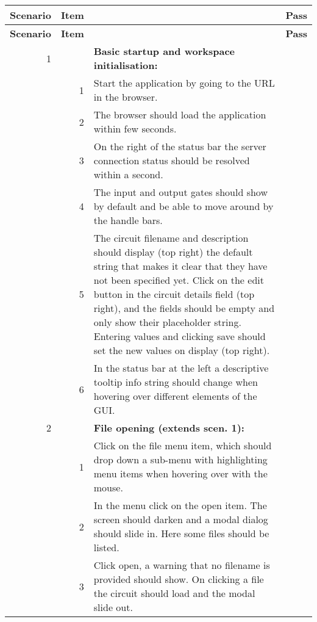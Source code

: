 \documentclass{article}
\begin{document}
\begin{center}
\begin{longtable}{r r  p{} l } \toprule
\textbf{Scenario} & \textbf{Item} & & \textbf{Pass} \\\midrule
\endfirsthead
\toprule
\textbf{Scenario} & \textbf{Item} & & \textbf{Pass} \\\midrule
\endhead
1 && \textbf{Basic startup and workspace initialisation:}\\
&1& Start the application by going to the URL in the browser.\\
&2& The browser should load the application within few seconds.\\
&3& On the right of the status bar the server connection status should be resolved within a second. \\
&4& The input and output gates should show by default and be able to move around by the handle bars. \\
&5& The circuit filename and description should display (top right) the default string that makes it clear that they have not been specified yet. Click on the edit button in the circuit details field (top right), and the fields should be empty and only show their placeholder string. Entering values and clicking save should set the new values on display (top right).\\
&6& In the status bar at the left a descriptive tooltip info string should change when hovering over different elements of the GUI. & \\ \midrule

2 && \textbf{File opening (extends scen. 1):}\\
&1& Click on the file menu item, which should drop down a sub-menu with highlighting menu items when hovering over with the mouse. \\
&2& In the menu click on the open item. The screen should darken and a modal dialog should slide in. Here some files should be listed.\\
&3& Click open, a warning that no filename is provided should show. On clicking a file the circuit should load and the modal slide out.\\\midrule


\end{longtable}
\end{center}
\end{document}
